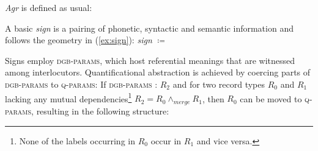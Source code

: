 \documentclass[output=paper
 	        ,biblatex
                ,babelshorthands
                ,newtxmath
                ,draftmode
                ,colorlinks, citecolor=brown
]{langscibook}
\begin{document}
\emph{Agr} is defined as usual:
%
\ea
{}
\z 



A basic \emph{sign} is a pairing of phonetic, syntactic and semantic information and follows the geometry in (\ref{ex:sign}): 
%
\ea \label{ex:sign}
\emph{sign} $\coloneqq$ 
\z

Signs employ \textsc{dgb-params}, which host referential meanings that are witnessed among interlocutors. 
%
Quantificational abstraction is achieved by coercing parts of \textsc{dgb-params} to \textsc{q-params}:
%
\ea
If \textsc{dgb-params} : $R_2$ and for two record types $R_0$ and $R_1$ lacking any mutual dependencies\footnote{None of the labels occurring in $R_0$ occur in $R_1$ and vice versa.}
$R_2 = R_0 \wedge_{merge} R_1$,
then $R_0$ can be moved to \textsc{q-params}, resulting in the following structure: \par\medskip 
 
\end{document}
